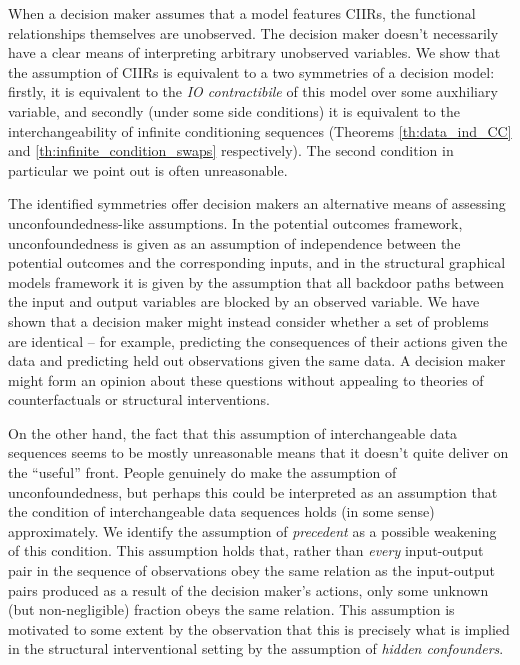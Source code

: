 When a decision maker assumes that a model features CIIRs, the functional relationships themselves are unobserved. The decision maker doesn't necessarily have a clear means of interpreting arbitrary unobserved variables. We show that the assumption of CIIRs is equivalent to a two symmetries of a decision model: firstly, it is equivalent to the \emph{IO contractibile} of this model over some auxhiliary variable, and secondly (under some side conditions) it is equivalent to the interchangeability of infinite conditioning sequences (Theorems \ref{th:data_ind_CC} and \ref{th:infinite_condition_swaps} respectively). The second condition in particular we point out is often unreasonable.

The identified symmetries offer decision makers an alternative means of assessing unconfoundedness-like assumptions. In the potential outcomes framework, unconfoundedness is given as an assumption of independence between the potential outcomes and the corresponding inputs, and in the structural graphical models framework it is given by the assumption that all backdoor paths between the input and output variables are blocked by an observed variable. We have shown that a decision maker might instead consider whether a set of problems are identical -- for example, predicting the consequences of their actions given the data and predicting held out observations given the same data. A decision maker might form an opinion about these questions without appealing to theories of counterfactuals or structural interventions.

On the other hand, the fact that this assumption of interchangeable data sequences seems to be mostly unreasonable means that it doesn't quite deliver on the ``useful'' front. People genuinely do make the assumption of unconfoundedness, but perhaps this could be interpreted as an assumption that the condition of interchangeable data sequences holds (in some sense) approximately. We identify the assumption of \emph{precedent} as a possible weakening of this condition. This assumption holds that, rather than \emph{every} input-output pair in the sequence of observations obey the same relation as the input-output pairs produced as a result of the decision maker's actions, only some unknown (but non-negligible) fraction obeys the same relation. This assumption is motivated to some extent by the observation that this is precisely what is implied in the structural interventional setting by the assumption of \emph{hidden confounders}.

